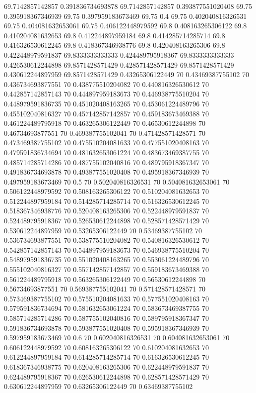 {69.7142857142857 0.391836734693878
69.7142857142857 0.393877551020408
69.75 0.395918367346939
69.75 0.397959183673469
69.75 0.4
69.75 0.402040816326531
69.75 0.404081632653061
69.75 0.406122448979592
69.8 0.408163265306122
69.8 0.410204081632653
69.8 0.412244897959184
69.8 0.414285714285714
69.8 0.416326530612245
69.8 0.418367346938776
69.8 0.420408163265306
69.8 0.422448979591837
69.8333333333333 0.424489795918367
69.8333333333333 0.426530612244898
69.8571428571429 0.428571428571429
69.8571428571429 0.430612244897959
69.8571428571429 0.43265306122449
70 0.43469387755102
70 0.436734693877551
70 0.438775510204082
70 0.440816326530612
70 0.442857142857143
70 0.444897959183673
70 0.446938775510204
70 0.448979591836735
70 0.451020408163265
70 0.453061224489796
70 0.455102040816327
70 0.457142857142857
70 0.459183673469388
70 0.461224489795918
70 0.463265306122449
70 0.46530612244898
70 0.46734693877551
70 0.469387755102041
70 0.471428571428571
70 0.473469387755102
70 0.475510204081633
70 0.477551020408163
70 0.479591836734694
70 0.481632653061224
70 0.483673469387755
70 0.485714285714286
70 0.487755102040816
70 0.489795918367347
70 0.491836734693878
70 0.493877551020408
70 0.495918367346939
70 0.497959183673469
70 0.5
70 0.502040816326531
70 0.504081632653061
70 0.506122448979592
70 0.508163265306122
70 0.510204081632653
70 0.512244897959184
70 0.514285714285714
70 0.516326530612245
70 0.518367346938776
70 0.520408163265306
70 0.522448979591837
70 0.524489795918367
70 0.526530612244898
70 0.528571428571429
70 0.530612244897959
70 0.53265306122449
70 0.53469387755102
70 0.536734693877551
70 0.538775510204082
70 0.540816326530612
70 0.542857142857143
70 0.544897959183673
70 0.546938775510204
70 0.548979591836735
70 0.551020408163265
70 0.553061224489796
70 0.555102040816327
70 0.557142857142857
70 0.559183673469388
70 0.561224489795918
70 0.563265306122449
70 0.56530612244898
70 0.56734693877551
70 0.569387755102041
70 0.571428571428571
70 0.573469387755102
70 0.575510204081633
70 0.577551020408163
70 0.579591836734694
70 0.581632653061224
70 0.583673469387755
70 0.585714285714286
70 0.587755102040816
70 0.589795918367347
70 0.591836734693878
70 0.593877551020408
70 0.595918367346939
70 0.597959183673469
70 0.6
70 0.602040816326531
70 0.604081632653061
70 0.606122448979592
70 0.608163265306122
70 0.610204081632653
70 0.612244897959184
70 0.614285714285714
70 0.616326530612245
70 0.618367346938775
70 0.620408163265306
70 0.622448979591837
70 0.624489795918367
70 0.626530612244898
70 0.628571428571429
70 0.630612244897959
70 0.63265306122449
70 0.63469387755102
}
